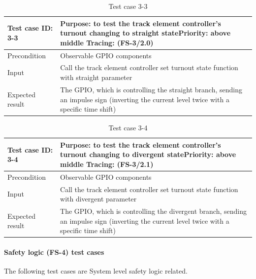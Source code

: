 \begin{table}[H]
	\caption{Test case 3-3}
	\label{table:TCase-FS3-3}
	\begin{center}
		\renewcommand{\arraystretch}{1.8}
		\begin{tabu} 
			to 0.9 \textwidth
			{  X[0.4, c] X[c] }
			\toprule
			Test case ID: 3-3 & Purpose: to test the track element controller's turnout changing to straight state\newline Priority: above middle \newline Tracing: (FS-3/2.0)\\ \midrule
			Precondition & Observable GPIO components \\
			Input & Call the track element controller set turnout state function with straight parameter  \\
			Expected result & The GPIO, which is controlling the straight branch, sending an impulse sign (inverting the current level twice with a specific time shift) \\ \bottomrule
		\end{tabu}
	\end{center}
\end{table}

\begin{table}[H]
	\caption{Test case 3-4}
	\label{table:TCase-FS3-4}
	\begin{center}
		\renewcommand{\arraystretch}{1.8}
		\begin{tabu} 
			to 0.9 \textwidth
			{  X[0.4, c] X[c] }
			\toprule
			Test case ID: 3-4 & Purpose: to test the track element controller's turnout changing to divergent state\newline Priority: above middle \newline Tracing: (FS-3/2.1)\\ \midrule
			Precondition & Observable GPIO components \\
			Input & Call the track element controller set turnout state function with divergent parameter  \\
			Expected result & The GPIO, which is controlling the divergent branch, sending an impulse sign (inverting the current level twice with a specific time shift) \\ \bottomrule
		\end{tabu}
	\end{center}
\end{table}

\paragraph{Safety logic (FS-4) test cases} The following test cases are System level safety logic related.

